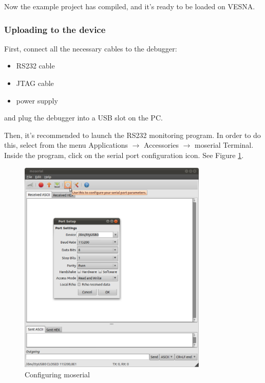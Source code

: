 \documentclass[a4paper, 10pt]{article}
\begin{document}
Now the example project has compiled, and it's ready to be loaded on VESNA.

\subsubsection{Uploading to the device}

First, connect all the necessary cables to the debugger:
    \begin{itemize}
    \item RS232 cable
    \item JTAG cable
    \item power supply
    \end{itemize}
and plug the debugger into a USB slot on the PC.

Then, it's recommended to launch the RS232 monitoring program.
In order to do this, select from the menu
Applications $\rightarrow$ Accessories $\rightarrow$ moserial Terminal.
Inside the program, click on the serial port configuration icon.
See Figure \ref{fig:moserial-config}.

    \begin{figure}[H]
    \centering
        \includegraphics[width=0.8\textwidth]{./install-guide-linux-images/moserial-config.png}
        \caption{Configuring moserial}
        \label{fig:moserial-config}
    \end{figure}
\end{document}
